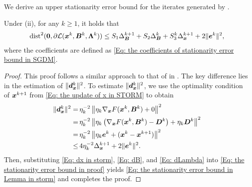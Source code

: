 We derive an upper stationarity error bound for the iterates generated by .
\begin{lemma}
    \label{Lemma: Stationarity error bound} Under  (ii),
    for any $k \geq 1$, it holds that
    \begin{align}
        \text{dist}^{2}(\bm{0}, \partial \mathcal{L}(\bm{x}^{k}, \bm{B}^{k}, \bm{\Lambda}^{k})) \leq S_{1}\Delta_{\bm{B}}^{k+1}+ S_{2}\Delta_{\bm{B}}^{k}+ S_{3}^{k}\Delta_{\bm{x}}^{k+1}+ 2 \| \bm{e}^{k}\|^{2}, \label{Eq: the stationarity error bound in Lemma in storm}
    \end{align}
    where the coefficients are defined as \eqref{Eq: the coefficients of stationarity error bound in SGDM}.
\end{lemma}
\begin{proof}
    This proof follows a similar approach to that of  
in . The key difference lies in 
the estimation of $\| \bm{d}_{\bm{x}}^{k}\|^{2}$. To estimate $\| \bm{d}_{\bm{x}}^{k}\|^{2}$, we use 
the optimality condition of $\bm{x}^{k+1}$ from \eqref{Eq: the update of x in STORM} to obtain
    \begin{align}
        \|\bm{d}_{\bm{x}}^{k}\|^{2}= & \,\eta_{k}^{-2}\left\| \eta_{k}\nabla_{\bm{x}}F(\bm{x}^{k}, \bm{B}^{k}) + 0\right\|^{2}\notag                                       \\
        =                      & \, \eta_{k}^{-2}\left\|\eta_{k}\left( \nabla_{\bm{x}}F(\bm{x}^{k}, \bm{B}^{k}) - \bm{D}^{k}\right) + \eta_{k}\bm{D}^{k}\right\|^{2}\notag \\
        =                      & \, \eta_{k}^{-2}\left\|\eta_{k}\bm{e}^{k}+ (\bm{x}^{k}- \bm{x}^{k+1})\right\|^{2}\notag                                                \\
        \leq                   & \, 4\eta_{k}^{-2}\Delta_{\bm{x}}^{k+1}+ 2 \| \bm{e}^{k}\|^{2}.\label{Eq: dx in storm}
    \end{align}
    Then, substituting \eqref{Eq: dx in storm}, \eqref{Eq: dB}, and \eqref{Eq: dLambda}
    into \eqref{Eq: the stationarity error bound in proof} yields \eqref{Eq: the stationarity error bound in Lemma in storm}
    and completes the proof. 
\end{proof}
